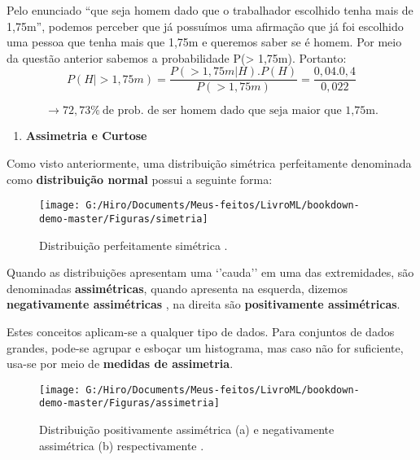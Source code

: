 \documentclass[
  openany]{book}
\providecommand{\tightlist}{%
  \setlength{\itemsep}{0pt}\setlength{\parskip}{0pt}}
\begin{document}
Pelo enunciado ``que seja homem dado que o trabalhador escolhido tenha mais de 1,75m'', podemos perceber que já possuímos uma afirmação que já foi escolhido uma pessoa que tenha mais que 1,75m e queremos saber se é homem. Por meio da questão anterior sabemos a probabilidade P(\textgreater{} 1,75m). Portanto:
\[P(H| > 1, 75m) = \frac{P(> 1, 75m|H).P(H)}{P(> 1, 75m)}=\frac{0,04.0,4}{0, 022} \]

\[→ 72,73\% \ \mbox{de prob. de ser homem dado que seja maior que 1,75m.}\]

\begin{enumerate}
\def\labelenumi{\arabic{enumi}.}
\setcounter{enumi}{8}
\tightlist
\item
  \textbf{Assimetria e Curtose}
\end{enumerate}

Como visto anteriormente, uma distribuição simétrica perfeitamente denominada como \textbf{distribuição normal} possui a seguinte forma:

\begin{figure}

{\centering \texttt{[image: G:/Hiro/Documents/Meus-feitos/LivroML/bookdown-demo-master/Figuras/simetria]} 

}

\caption{Distribuição perfeitamente simétrica \citep{freund2009estatistica}.}\label{fig:simetria}
\end{figure}



Quando as distribuições apresentam uma `'cauda'' em uma das extremidades, são denominadas \textbf{assimétricas}, quando apresenta na esquerda, dizemos \textbf{negativamente assimétricas} , na direita são \textbf{positivamente assimétricas}.

Estes conceitos aplicam-se a qualquer tipo de dados. Para conjuntos de dados grandes, pode-se agrupar e esboçar um histograma, mas caso não for suficiente, usa-se por meio de \textbf{medidas de assimetria}.

\begin{figure}

{\centering \texttt{[image: G:/Hiro/Documents/Meus-feitos/LivroML/bookdown-demo-master/Figuras/assimetria]} 

}

\caption{Distribuição positivamente assimétrica (a) e negativamente assimétrica (b) respectivamente \citep{freund2009estatistica}.}\label{fig:assimetria}
\end{figure}
\end{document}
